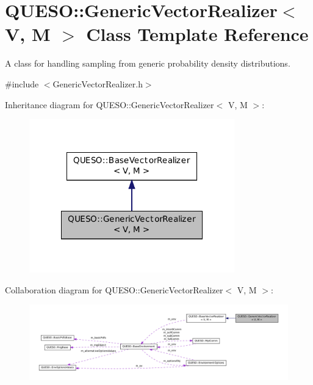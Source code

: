 \hypertarget{class_q_u_e_s_o_1_1_generic_vector_realizer}{\section{Q\-U\-E\-S\-O\-:\-:Generic\-Vector\-Realizer$<$ V, M $>$ Class Template Reference}
\label{class_q_u_e_s_o_1_1_generic_vector_realizer}
}


A class for handling sampling from generic probability density distributions.  




{\ttfamily \#include $<$Generic\-Vector\-Realizer.\-h$>$}



Inheritance diagram for Q\-U\-E\-S\-O\-:\-:Generic\-Vector\-Realizer$<$ V, M $>$\-:
\nopagebreak
\begin{figure}[H]
\begin{center}
\leavevmode
\includegraphics[width=252pt]{class_q_u_e_s_o_1_1_generic_vector_realizer__inherit__graph}
\end{center}
\end{figure}


Collaboration diagram for Q\-U\-E\-S\-O\-:\-:Generic\-Vector\-Realizer$<$ V, M $>$\-:
\nopagebreak
\begin{figure}[H]
\begin{center}
\leavevmode
\includegraphics[width=350pt]{class_q_u_e_s_o_1_1_generic_vector_realizer__coll__graph}
\end{center}
\end{figure}
